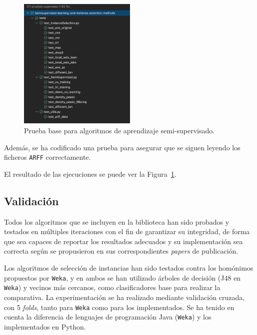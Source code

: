 \begin{figure}
\centering
\includegraphics[width=0.5\textwidth]{../img/anexos/manual-programador/tests-superados-is-ssl}
\caption{Prueba base para algoritmos de aprendizaje semi-supervisado.}\label{fig:tests-superados-is-ssl}

\end{figure}

Además, se ha codificado una prueba para asegurar que se siguen leyendo los ficheros \texttt{ARFF} correctamente.

El resultado de las ejecuciones se puede ver la Figura~\ref{fig:tests-superados-is-ssl}.

\subsection{Validación}
Todos los algoritmos que se incluyen en la biblioteca han sido probados y testados en múltiples iteraciones con el fin de garantizar su integridad, de forma que sea capaces de reportar los resultados adecuados y su implementación sea correcta según se propusieron en sus correspondientes \textit{papers} de publicación.

Los algoritmos de selección de instancias han sido testados contra los homónimos propuestos por \texttt{Weka}, y en ambos se han utilizado árboles de decisión (J48 en \texttt{Weka}) y vecinos más cercanos, como clasificadores base para realizar la comparativa. La experimentación se ha realizado mediante validación cruzada, con 5 \textit{folds}, tanto para \texttt{Weka} como para los implementados. Se ha tenido en cuenta la diferencia de lenguajes de programación Java (\texttt{Weka}) y los implementados en Python.


